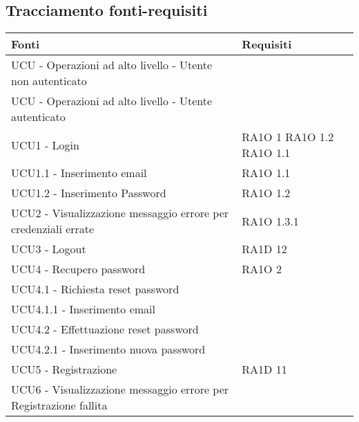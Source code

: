 \subsection{Tracciamento fonti-requisiti}
      \begin{center}
      \bgroup
      \def\arraystretch{1.8}
      \begin{longtable}{ | p{5cm} | p{5cm} |}
    
      \cellcolor[gray]{0.9} \textbf{Fonti} & \cellcolor[gray]{0.9} \textbf{Requisiti} \\ \hline       
            UCU - Operazioni ad alto livello - Utente non autenticato &  \\ \hline      
            UCU - Operazioni ad alto livello - Utente autenticato &  \\ \hline      
            UCU1 - Login &  RA1O 1 \newline  RA1O 1.2 \newline  RA1O 1.1 \newline  \\ \hline      
            UCU1.1 - Inserimento email &  RA1O 1.1 \newline  \\ \hline      
            UCU1.2 - Inserimento Password &  RA1O 1.2 \newline  \\ \hline      
            UCU2 - Visualizzazione messaggio errore per credenziali errate &  RA1O 1.3.1 \newline  \\ \hline      
            UCU3 - Logout &  RA1D 12 \newline  \\ \hline      
            UCU4 - Recupero password &  RA1O 2  \newline  \\ \hline      
            UCU4.1 - Richiesta reset password &  \\ \hline      
            UCU4.1.1 - Inserimento email &  \\ \hline      
            UCU4.2 - Effettuazione reset password &  \\ \hline      
            UCU4.2.1 - Inserimento nuova password &  \\ \hline      
            UCU5 - Registrazione &  RA1D 11 \newline  \\ \hline      
            UCU6 - Visualizzazione messaggio errore per Registrazione fallita &  \\ \hline      

\end{longtable}
\end{center}
